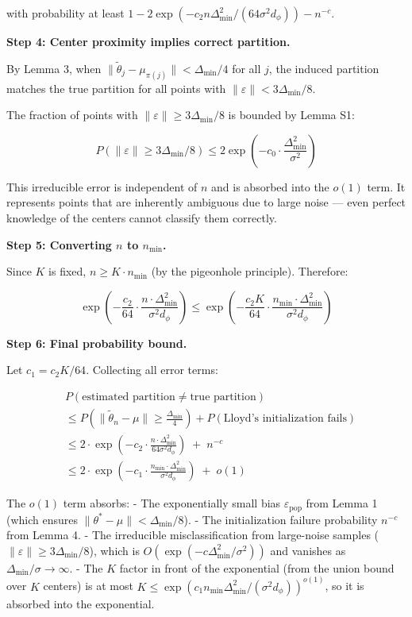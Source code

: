 \documentclass[
  12pt,
]{article}
\begin{document}
with probability at least
\(1 - 2\exp(-c_2 n \Delta_{\min}^2 / (64 \sigma^2 d_\phi)) - n^{-c}\).

\textbf{Step 4: Center proximity implies correct partition.}

By Lemma 3, when
\(\|\tilde{\theta}_j - \mu_{\pi(j)}\| < \Delta_{\min}/4\) for all \(j\),
the induced partition matches the true partition for all points with
\(\|\varepsilon\| < 3\Delta_{\min}/8\).

The fraction of points with \(\|\varepsilon\| \geq 3\Delta_{\min}/8\) is
bounded by Lemma S1:

\[P(\|\varepsilon\| \geq 3\Delta_{\min}/8) \leq 2 \exp\left(-c_0 \cdot \frac{\Delta_{\min}^2}{\sigma^2}\right)\]

This irreducible error is independent of \(n\) and is absorbed into the
\(o(1)\) term. It represents points that are inherently ambiguous due to
large noise --- even perfect knowledge of the centers cannot classify
them correctly.

\textbf{Step 5: Converting \(n\) to \(n_{\min}\).}

Since \(K\) is fixed, \(n \geq K \cdot n_{\min}\) (by the pigeonhole
principle). Therefore:

\[\exp\left(-\frac{c_2}{64} \cdot \frac{n \cdot \Delta_{\min}^2}{\sigma^2 d_\phi}\right) \leq \exp\left(-\frac{c_2 K}{64} \cdot \frac{n_{\min} \cdot \Delta_{\min}^2}{\sigma^2 d_\phi}\right)\]

\textbf{Step 6: Final probability bound.}

Let \(c_1 = c_2 K / 64\). Collecting all error terms:

\[\begin{aligned}
&P(\text{estimated partition} \neq \text{true partition}) \\
&\leq P\left(\|\tilde{\theta}_n - \mu\| \geq \frac{\Delta_{\min}}{4}\right) + P(\text{Lloyd's initialization fails}) \\
&\leq 2 \cdot \exp\left(-c_2 \cdot \frac{n \cdot \Delta_{\min}^2}{64 \sigma^2 d_\phi}\right) \;+\; n^{-c} \\
&\leq 2 \cdot \exp\left(-c_1 \cdot \frac{n_{\min} \cdot \Delta_{\min}^2}{\sigma^2 d_\phi}\right) \;+\; o(1)
\end{aligned}\]

The \(o(1)\) term absorbs: - The exponentially small bias
\(\varepsilon_{\text{pop}}\) from Lemma 1 (which ensures
\(\|\theta^* - \mu\| < \Delta_{\min}/8\)). - The initialization failure
probability \(n^{-c}\) from Lemma 4. - The irreducible misclassification
from large-noise samples (\(\|\varepsilon\| \geq 3\Delta_{\min}/8\)),
which is \(O(\exp(-c \Delta_{\min}^2/\sigma^2))\) and vanishes as
\(\Delta_{\min}/\sigma \to \infty\). - The \(K\) factor in front of the
exponential (from the union bound over \(K\) centers) is at most
\(K \leq \exp(c_1 n_{\min} \Delta_{\min}^2 / (\sigma^2 d_\phi))^{o(1)}\),
so it is absorbed into the exponential.
\end{document}

